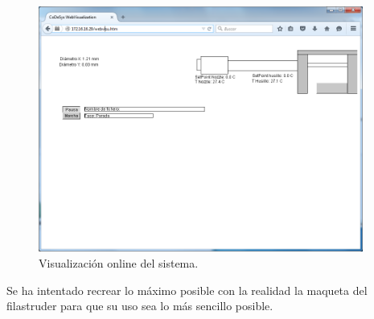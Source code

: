     \begin{figure}[H]
            \centering
            \includegraphics[width=0.95\textwidth]{images/PLC/visu_online.png}
            \caption{Visualización online del sistema.}
            \label{fig:plc_visu_web}
    \end{figure}

Se ha intentado recrear lo máximo posible con la realidad la maqueta del filastruder para que su uso sea lo más sencillo posible.


